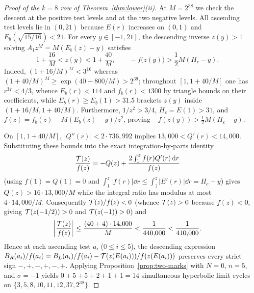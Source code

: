 \begin{proof}[Proof of the $k=8$ row of Theorem~\ref{thm:lower}\textup{(ii)}]
At $M=2^{38}$ we check the descent at the positive test levels and at
the two negative levels. All ascending test levels lie in $(0,21)$ because $E(r)$ increases on $(0,1)$ and
$E_b(\sqrt{15/16})<21$. For every $y\in[-1,21]$, the descending inverse $z(y)>1$ solving $A_1
z^M=M(E_b(z)-y)$ satisfies
\[
  1 + \frac{16}{M} < z(y) < 1 + \frac{40}{M}, \qquad -f\bigl(z(y)\bigr) > \frac{1}{2}M(H_c-y).
\]
Indeed, $(1+16/M)^M<3^{16}$ whereas $(1+40/M)^M\ge\exp(40-800/M)>2^{39}$; throughout $[1,1+40/M]$ one
has $r^{37}<4/3$, whence $E_b(r)<114$ and $f_b(r)<1300$ by triangle bounds on their coefficients,
while $E_b(r)\ge E_b(1)>31.5$ brackets $z(y)$ inside $(1+16/M,1+40/M)$. Furthermore, $1/z^2>3/4$,
$H_c=E(1)>31$, and $f(z)=f_b(z)-M(E_b(z)-y)/z^2$, proving $-f(z(y))>\frac{1}{2}M(H_c-y)$.

On $[1,1+40/M]$, $|Q''(r)|<2\cdot 736{,}992$ implies $13{,}000<Q'(r)<14{,}000$. Substituting these
bounds into the exact integration-by-parts identity
\[
  \frac{\mathcal{T}(z)}{f(z)} = -Q(z) + \frac{2\int_1^z f(r)Q'(r)\,\mathrm{d} r}{f(z)}
\]
(using $f(1)=Q(1)=0$ and $\int_1^z|f(r)|\dd r\le\int_1^z|E'(r)|\dd r=H_c-y$) gives $Q(z)>16\cdot
13{,}000/M$ while the integral ratio has modulus at most $4\cdot 14{,}000/M$. Consequently
$\mathcal{T}(z)/f(z)<0$ (whence $\mathcal{T}(z)>0$ because $f(z)<0$, giving $\mathcal{T}(z(-1/2))>0$ and $\mathcal{T}(z(-1))>0$) and
\[
  \left|\frac{\mathcal{T}(z)}{f(z)}\right| \le \frac{(40+4)\cdot 14{,}000}{M} < \frac{1}{440{,}000} < \frac{1}{410{,}000}.
\]
Hence at each ascending test $a_i$ ($0\le i\le 5$), the descending expression
$B_R(a_i)/f(a_i)=B_L(a_i)/f(a_i)-\mathcal{T}(z(E(a_i)))/f(z(E(a_i)))$ preserves every strict sign
$-,+,-,+,-,+$. Applying Proposition~\ref{prop:two-marks} with $N=0$, $n=5$, and $\sigma=-1$ yields
$0+5+5+2+1+1=14$ simultaneous hyperbolic limit cycles on $\{3,5,8,10,11,12,37,2^{38}\}$.
\end{proof}
